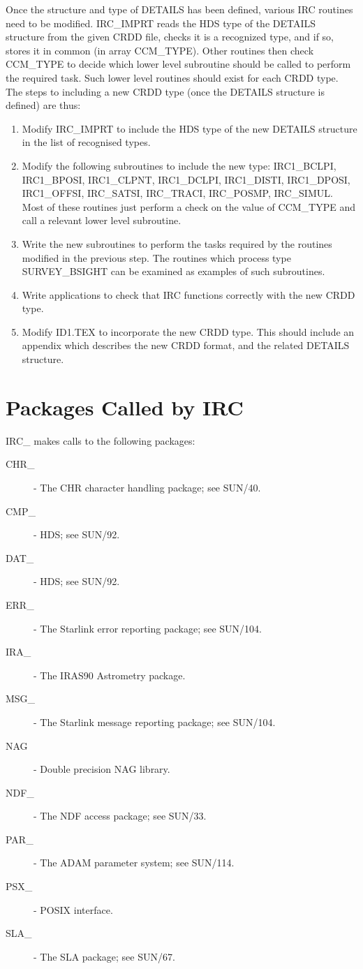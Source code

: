 Once the structure and type of DETAILS has been defined, various IRC routines 
need to be modified. IRC\_IMPRT reads the HDS type of the DETAILS structure 
from the given CRDD file, checks it is a recognized type, and if so, stores it 
in common (in array CCM\_TYPE). Other routines then check CCM\_TYPE to decide
which lower level subroutine should be called to perform the required task. 
Such lower level routines should exist for each CRDD type. The steps to
including a new CRDD type (once the DETAILS structure is defined) are thus:

\begin {enumerate}
\item Modify IRC\_IMPRT to include the HDS type of the new DETAILS structure in 
the list of recognised types.
\item Modify the following subroutines to include the new type: IRC1\_BCLPI,
IRC1\_BPOSI, IRC1\_CLPNT, IRC1\_DCLPI, IRC1\_DISTI, IRC1\_DPOSI, IRC1\_OFFSI,
IRC\_SATSI, IRC\_TRACI, IRC\_POSMP, IRC\_SIMUL. Most of these routines just
perform a check on the value of CCM\_TYPE and call a relevant lower level
subroutine. 
\item Write the new subroutines to perform the tasks required by the routines 
modified in the previous step. The routines which process type SURVEY\_BSIGHT 
can be examined as examples of such subroutines.
\item Write applications to check that IRC functions correctly with the new CRDD 
type.
\item Modify ID1.TEX to incorporate the new CRDD type. This should include an
appendix which describes the new CRDD format, and the related DETAILS structure.
\end {enumerate}

\section {Packages Called by IRC}
IRC\_ makes calls to the following packages:
\begin {description}
\item [CHR\_] - The CHR character handling package; see SUN/40.
\item [CMP\_] - HDS; see SUN/92.
\item [DAT\_] - HDS; see SUN/92.
\item [ERR\_] - The Starlink error reporting package; see SUN/104.
\item [IRA\_] - The IRAS90 Astrometry package.
\item [MSG\_] - The Starlink message reporting package; see SUN/104.
\item [NAG] - Double precision NAG library.
\item [NDF\_] - The NDF access package; see SUN/33.
\item [PAR\_] - The ADAM parameter system; see SUN/114.
\item [PSX\_] - POSIX interface.
\item [SLA\_] - The SLA package; see SUN/67.
\end{description}

